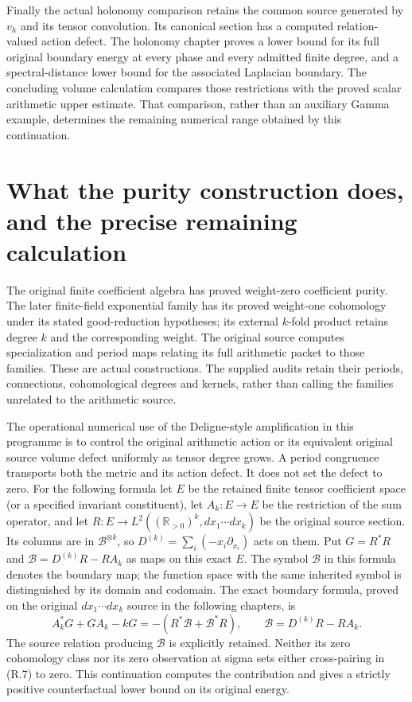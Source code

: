 Finally the actual holonomy comparison retains the common source
generated by $v_h$ and its tensor convolution. Its canonical section has
a computed relation-valued action defect. The holonomy chapter proves
a lower bound for its full original boundary energy at every phase and
every admitted finite degree, and a spectral-distance lower bound for
the associated Laplacian boundary. The concluding volume calculation
compares those restrictions with the proved scalar arithmetic upper
estimate. That comparison, rather than an auxiliary Gamma example,
determines the remaining numerical range obtained by this continuation.

\section{What the purity construction does, and the precise remaining calculation}

The original finite coefficient algebra has proved weight-zero
coefficient purity. The later finite-field exponential family has its
proved weight-one cohomology under its stated good-reduction hypotheses;
its external $k$-fold product retains degree $k$ and the corresponding
weight. The original source computes specialization and period maps
relating its full arithmetic packet to those families. These are actual
constructions. The supplied audits retain their periods, connections,
cohomological degrees and kernels, rather than calling the families
unrelated to the arithmetic source.

The operational numerical use of the Deligne-style amplification in
this programme is to control the original arithmetic action or its
equivalent original source volume defect uniformly as tensor degree
grows. A period congruence transports both the metric and its action
defect. It does not set the defect to zero. For the following formula
let $E$ be the retained finite tensor coefficient space (or a specified
invariant constituent), let $A_k:E\to E$ be the restriction of the sum
operator, and let $R:E\to L^2((\mathbb R_{>0})^k,dx_1\cdots dx_k)$
be the original source section. Its columns are in $\mathscr B^{\otimes k}$,
so $D^{(k)}=\sum_i(-x_i\partial_{x_i})$ acts on them. Put
$G=R^*R$ and $\mathscr B=D^{(k)}R-RA_k$ as maps on this exact $E$.
The symbol $\mathscr B$ in this formula denotes the boundary map;
the function space with the same inherited symbol is distinguished by
its domain and codomain. The exact boundary formula,
proved on the original $dx_1\cdots dx_k$ source in the following chapters,
is
\[
A_k^*G+GA_k-kG=-(R^*\mathscr B+\mathscr B^*R),
\qquad \mathscr B=D^{(k)}R-RA_k.                        \tag{R.7}
\]
The source relation producing $\mathscr B$ is explicitly retained.
Neither its zero cohomology class nor its zero observation at sigma
sets either cross-pairing in (R.7) to zero. This continuation computes
the contribution and gives a strictly positive counterfactual lower
bound on its original energy.

